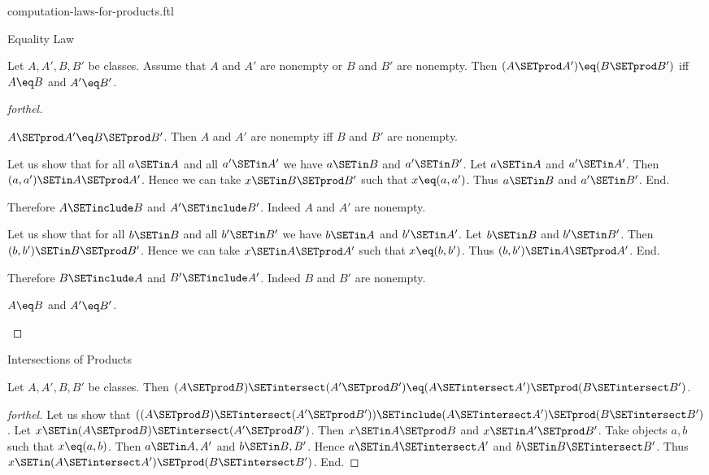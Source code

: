 \documentclass{stex}
\begin{document}
\begin{smodule}{computation-laws-for-products.ftl}
\begin{sfragment}{Equality Law}
  \begin{proposition}[forthel,id=FOUNDATIONS_05_2677218429894656]
    Let $A, A', B, B'$ be classes.
    Assume that $A$ and $A'$ are nonempty or $B$ and $B'$ are nonempty.
    Then $(A \SETprod A') \eq (B \SETprod B')$ iff $A \eq B$ and $A' \eq B'$.
  \end{proposition}
  \begin{proof}[forthel]
    \begin{case}{$A \SETprod A' \eq B \SETprod B'$.}
      Then $A$ and $A'$ are nonempty iff $B$ and $B'$ are nonempty.

      Let us show that for all $a \SETin A$ and all $a' \SETin A'$ we have $a \SETin B$ and $a' \SETin B'$.
        Let $a \SETin A$ and $a' \SETin A'$.
        Then $(a, a') \SETin A \SETprod A'$.
        Hence we can take $x \SETin B \SETprod B'$ such that $x \eq (a, a')$.
        Thus $a \SETin B$ and $a' \SETin B'$.
      End.

      Therefore $A \SETinclude B$ and $A' \SETinclude B'$.
      Indeed $A$ and $A'$ are nonempty.

      Let us show that for all $b \SETin B$ and all $b' \SETin B'$ we have $b \SETin A$ and $b' \SETin A'$.
        Let $b \SETin B$ and $b' \SETin B'$.
        Then $(b, b') \SETin B \SETprod B'$.
        Hence we can take $x \SETin A \SETprod A'$ such that $x \eq (b, b')$.
        Thus $(b, b') \SETin A \SETprod A'$.
      End.

      Therefore $B \SETinclude A$ and $B' \SETinclude A'$.
      Indeed $B$ and $B'$ are nonempty.
    \end{case}

    \begin{case}{$A \eq B$ and $A' \eq B'$.} \end{case}
  \end{proof}
\end{sfragment}

\begin{sfragment}{Intersections of Products}
  \begin{proposition}[forthel,id=FOUNDATIONS_05_4154592050806784]
    Let $A, A', B, B'$ be classes.
    Then $(A \SETprod B) \SETintersect (A' \SETprod B') \eq (A \SETintersect A') \SETprod (B \SETintersect B')$.
  \end{proposition}
  \begin{proof}[forthel]
    Let us show that $((A \SETprod B) \SETintersect (A' \SETprod B')) \SETinclude (A \SETintersect A') \SETprod (B \SETintersect B')$. %
      Let $x \SETin (A \SETprod B) \SETintersect (A' \SETprod B')$.
      Then $x \SETin A \SETprod B$ and $x \SETin A' \SETprod B'$.
      Take objects $a, b$ such that $x \eq (a, b)$.
      Then $a \SETin A, A'$ and $b \SETin B, B'$.
      Hence $a \SETin A \SETintersect A'$ and $b \SETin B \SETintersect B'$.
      Thus $x \SETin (A \SETintersect A') \SETprod (B \SETintersect B')$.
    End.


\end{proof}
\end{sfragment}
\end{smodule}
\end{document}
